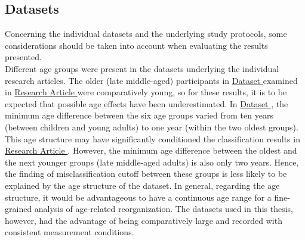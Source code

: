 \subsection{Datasets}
Concerning the individual datasets and the underlying study protocols, some considerations should be taken into account when evaluating the results presented.\\
Different age groups were present in the datasets underlying the individual research articles. The older (late middle-aged) participants in \hyperref[methods:datasets:I]{Dataset } examined in \hyperref[results:paperI]{Research Article } were comparatively young, so for these results, it is to be expected that possible age effects have been underestimated. In \hyperref[methods:datasets:II]{Dataset }, the minimum age difference between the six age groups varied from ten years (between children and young adults) to one year (within the two oldest groups). This age structure may have significantly conditioned the classification results in \hyperref[results:paperII]{Research Article }. However, the minimum age difference between the oldest and the next younger groups (late middle-aged adults) is also only two years. Hence, the finding of misclassification cutoff between these groups is less likely to be explained by the age structure of the dataset. In general, regarding the age structure, it would be advantageous to have a continuous age range for a fine-grained analysis of age-related reorganization. The datasets used in this thesis, however, had the advantage of being comparatively large and recorded with consistent measurement conditions.\\
